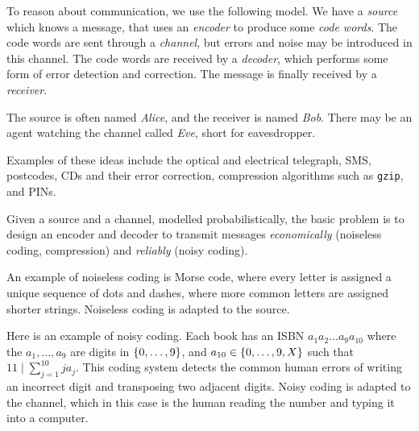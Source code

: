 To reason about communication, we use the following model.
We have a \emph{source} which knows a message, that uses an \emph{encoder} to produce some \emph{code words}.
The code words are sent through a \emph{channel}, but errors and noise may be introduced in this channel.
The code words are received by a \emph{decoder}, which performs some form of error detection and correction.
The message is finally received by a \emph{receiver}.

The source is often named \emph{Alice}, and the receiver is named \emph{Bob}.
There may be an agent watching the channel called \emph{Eve}, short for eavesdropper.

Examples of these ideas include the optical and electrical telegraph, SMS, postcodes, CDs and their error correction, compression algorithms such as \texttt{gzip}, and PINs.

Given a source and a channel, modelled probabilistically, the basic problem is to design an encoder and decoder to transmit messages \emph{economically} (noiseless coding, compression) and \emph{reliably} (noisy coding).

An example of noiseless coding is Morse code, where every letter is assigned a unique sequence of dots and dashes, where more common letters are assigned shorter strings.
Noiseless coding is adapted to the source.

Here is an example of noisy coding.
Each book has an ISBN \( a_1 a_2 \dots a_9 a_{10} \) where the \( a_1, \dots, a_9 \) are digits in \( \qty{0, \dots, 9} \), and \( a_{10} \in \qty{0, \dots, 9, X} \) such that \( 11 \mid \sum_{j=1}^{10} j a_j \).
This coding system detects the common human errors of writing an incorrect digit and transposing two adjacent digits.
Noisy coding is adapted to the channel, which in this case is the human reading the number and typing it into a computer.


